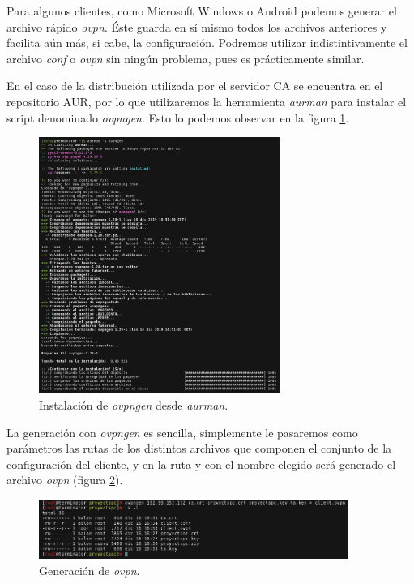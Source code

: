\documentclass[a4paper, 11pt, titlepage]{article}
\begin{document}
        Para algunos clientes, como Microsoft Windows o Android podemos generar el archivo rápido
        \textit{ovpn}. Éste guarda en sí mismo todos los archivos anteriores y facilita aún más, si 
        cabe, la configuración. Podremos utilizar indistintivamente el archivo \textit{conf} o 
        \textit{ovpn} sin ningún problema, pues es prácticamente similar.

        En el caso de la distribución utilizada por el servidor CA se encuentra en el repositorio 
        AUR, por lo que utilizaremos la herramienta \textit{aurman} para instalar el script 
        denominado \textit{ovpngen}. Esto lo podemos observar en la figura \ref{fig:windows06}.

        \begin{figure}[htp]
            \centering
            \includegraphics[width=0.7\textwidth]{resources/windows06.png}
            \caption{Instalación de \textit{ovpngen} desde \textit{aurman}.}
            \label{fig:windows06}
        \end{figure}  

        La generación con \textit{ovpngen} es sencilla, simplemente le pasaremos como parámetros las
        rutas de los distintos archivos que componen el conjunto de la configuración del cliente,
        y en la ruta y con el nombre elegido será generado el archivo \textit{ovpn} (figura \ref{fig:windows07}).

        \begin{figure}[htp]
            \centering
            \includegraphics[width=0.9\textwidth]{resources/windows07.png}
            \caption{Generación de \textit{ovpn}.}
            \label{fig:windows07}
        \end{figure}  
\end{document}

